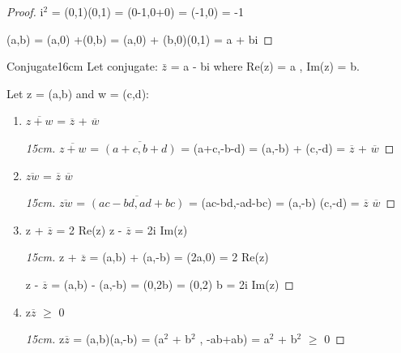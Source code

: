 	\begin{proof}
		i$^\text{2}$ = (0,1)(0,1) = (0-1,0+0) = (-1,0) = -1

		(a,b) = (a,0) +(0,b) = (a,0) + (b,0)(0,1) = a + bi
	\end{proof}
	
	\newpage



	\begin{definition}{Conjugate}{16cm}
		Let conjugate: $\bar{z}$ = a - bi where Re(z) = a , Im(z) = b.

		Let z = (a,b) and w = (c,d):
	\end{definition}

	\begin{enumerate}[label=(\alph*), leftmargin=2cm, itemsep=0.1cm]
		\item $\overline{z+w}$ = $\overline{z}$ + $\overline{w}$
		
			\begin{proof}[15cm]
				$\overline{z+w}$ = $\overline{(a+c,b+d)}$ = (a+c,-b-d)
				= (a,-b) + (c,-d) = $\overline{z}$ + $\overline{w}$
			\end{proof}

		\item $\overline{zw}$ = $\overline{z}$ $\overline{w}$
		
			\begin{proof}[15cm]
				$\overline{zw}$ = $\overline{(ac-bd,ad+bc)}$ = (ac-bd,-ad-bc)
				= (a,-b) (c,-d) = $\overline{z}$ $\overline{w}$
			\end{proof}

		\item z + $\overline{z}$ = 2 Re(z)
			\hspace{1cm} z - $\overline{z}$ = 2i Im(z)

			\begin{proof}[15cm]
				z + $\overline{z}$ = (a,b) + (a,-b) = (2a,0) = 2 Re(z)

				z - $\overline{z}$ = (a,b) - (a,-b) = (0,2b) = (0,2) b = 2i Im(z)
			\end{proof}

		\item z$\overline{z}$ $\geq$ 0

			\begin{proof}[15cm]
				z$\overline{z}$ = (a,b)(a,-b) = (a$^2$ + b$^2$ , -ab+ab)
				= a$^2$ + b$^2$ $\geq$ 0
			\end{proof}
	\end{enumerate}

	\vspace{0.5cm}




